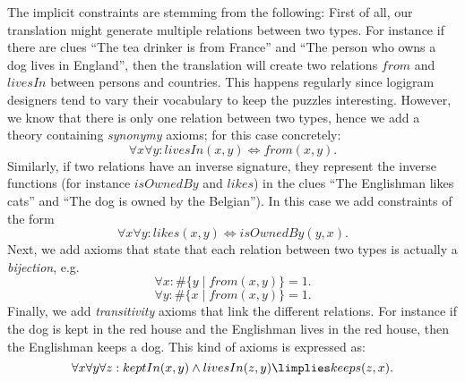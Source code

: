 The implicit constraints are stemming from the following: First of all, our translation might generate multiple relations between two types. For instance if there are clues ``The tea drinker is from France'' and ``The person who owns a dog lives in England'', then the translation will create two relations $\mathit{from}$ and $\mathit{livesIn}$ between persons and countries. This happens regularly since logigram designers tend to vary their vocabulary to keep the puzzles interesting. However, we know that there is only one relation between two types, hence we add a theory containing \emph{synonymy} axioms; for this case concretely: 
\[\forall x \forall y : livesIn(x, y) \Leftrightarrow from(x, y).\]
Similarly, if two relations have an inverse signature, they represent the inverse functions (for instance $\mathit{isOwnedBy}$ and $\mathit{likes}$) in the clues ``The Englishman likes cats'' and ``The dog is owned by the Belgian''). In this case we add constraints of the form
\[\forall x \forall y : likes(x, y) \Leftrightarrow isOwnedBy(y,x).\]
Next, we add axioms that state that each relation between two types is actually a \emph{bijection}, e.g. 
\[\forall x : \#\{y\mid from(x, y)\} = 1.\]\[\forall y : \#\{ x \mid from(x, y)\}=1.\]
Finally, we add \emph{transitivity} axioms that link the different relations. For instance if the dog is kept in the red house and the Englishman lives in the red house, then the Englishman keeps a dog. This kind of axioms is expressed as:
\[
 \forall x \forall y \forall z: keptIn(x,y) \land livesIn(z,y) \limplies keeps(z,x).
\]




